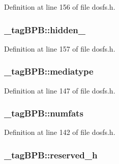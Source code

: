 Definition at line 156 of file dosfs.\-h.

\hypertarget{struct__tag_b_p_b_a80d18a3627cf46787461f4e8d88b495c}{
\subsubsection[{hidden\-\_\-3}]{ \-\_\-tag\-B\-P\-B\-::hidden\-\_}}\label{struct__tag_b_p_b_a80d18a3627cf46787461f4e8d88b495c}


Definition at line 157 of file dosfs.\-h.

\hypertarget{struct__tag_b_p_b_a4c2e50e2f2b7b532c0e8f67f9ac8e10d}{
\subsubsection[{mediatype}]{ \-\_\-tag\-B\-P\-B\-::mediatype}}\label{struct__tag_b_p_b_a4c2e50e2f2b7b532c0e8f67f9ac8e10d}


Definition at line 147 of file dosfs.\-h.

\hypertarget{struct__tag_b_p_b_a0d1d00766ed88a28af9933452ddc0e1e}{
\subsubsection[{numfats}]{ \-\_\-tag\-B\-P\-B\-::numfats}}\label{struct__tag_b_p_b_a0d1d00766ed88a28af9933452ddc0e1e}


Definition at line 142 of file dosfs.\-h.

\hypertarget{struct__tag_b_p_b_ab54c9d454d0ed1051ee1324a15712ce7}{
\subsubsection[{reserved\-\_\-h}]{ \-\_\-tag\-B\-P\-B\-::reserved\-\_\-h}}\label{struct__tag_b_p_b_ab54c9d454d0ed1051ee1324a15712ce7}


